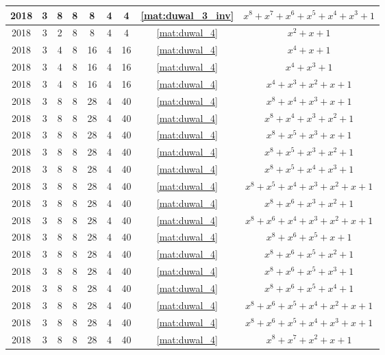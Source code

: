 \begin{longtable}{|c|c|c|c|c|c|c|c|c|}
2018 & 3 & 8 & 8 & 8 & 4 & 4 & \eqref{mat:duwal_3_inv} & $x^8 + x^7 + x^6 + x^5 + x^4 + x^3 + 1$ \\ \hline 
2018 & 3 & 2 & 8 & 8 & 4 & 4 & \eqref{mat:duwal_4} & $x^2 + x + 1$ \\ \hline 
2018 & 3 & 4 & 8 & 16 & 4 & 16 & \eqref{mat:duwal_4} & $x^4 + x + 1$ \\ \hline 
2018 & 3 & 4 & 8 & 16 & 4 & 16 & \eqref{mat:duwal_4} & $x^4 + x^3 + 1$ \\ \hline 
2018 & 3 & 4 & 8 & 16 & 4 & 16 & \eqref{mat:duwal_4} & $x^4 + x^3 + x^2 + x + 1$ \\ \hline 
2018 & 3 & 8 & 8 & 28 & 4 & 40 & \eqref{mat:duwal_4} & $x^8 + x^4 + x^3 + x + 1$ \\ \hline 
2018 & 3 & 8 & 8 & 28 & 4 & 40 & \eqref{mat:duwal_4} & $x^8 + x^4 + x^3 + x^2 + 1$ \\ \hline 
2018 & 3 & 8 & 8 & 28 & 4 & 40 & \eqref{mat:duwal_4} & $x^8 + x^5 + x^3 + x + 1$ \\ \hline 
2018 & 3 & 8 & 8 & 28 & 4 & 40 & \eqref{mat:duwal_4} & $x^8 + x^5 + x^3 + x^2 + 1$ \\ \hline 
2018 & 3 & 8 & 8 & 28 & 4 & 40 & \eqref{mat:duwal_4} & $x^8 + x^5 + x^4 + x^3 + 1$ \\ \hline 
2018 & 3 & 8 & 8 & 28 & 4 & 40 & \eqref{mat:duwal_4} & $x^8 + x^5 + x^4 + x^3 + x^2 + x + 1$ \\ \hline 
2018 & 3 & 8 & 8 & 28 & 4 & 40 & \eqref{mat:duwal_4} & $x^8 + x^6 + x^3 + x^2 + 1$ \\ \hline 
2018 & 3 & 8 & 8 & 28 & 4 & 40 & \eqref{mat:duwal_4} & $x^8 + x^6 + x^4 + x^3 + x^2 + x + 1$ \\ \hline 
2018 & 3 & 8 & 8 & 28 & 4 & 40 & \eqref{mat:duwal_4} & $x^8 + x^6 + x^5 + x + 1$ \\ \hline 
2018 & 3 & 8 & 8 & 28 & 4 & 40 & \eqref{mat:duwal_4} & $x^8 + x^6 + x^5 + x^2 + 1$ \\ \hline 
2018 & 3 & 8 & 8 & 28 & 4 & 40 & \eqref{mat:duwal_4} & $x^8 + x^6 + x^5 + x^3 + 1$ \\ \hline 
2018 & 3 & 8 & 8 & 28 & 4 & 40 & \eqref{mat:duwal_4} & $x^8 + x^6 + x^5 + x^4 + 1$ \\ \hline 
2018 & 3 & 8 & 8 & 28 & 4 & 40 & \eqref{mat:duwal_4} & $x^8 + x^6 + x^5 + x^4 + x^2 + x + 1$ \\ \hline 
2018 & 3 & 8 & 8 & 28 & 4 & 40 & \eqref{mat:duwal_4} & $x^8 + x^6 + x^5 + x^4 + x^3 + x + 1$ \\ \hline 
2018 & 3 & 8 & 8 & 28 & 4 & 40 & \eqref{mat:duwal_4} & $x^8 + x^7 + x^2 + x + 1$ \\ \hline 

\end{longtable}

